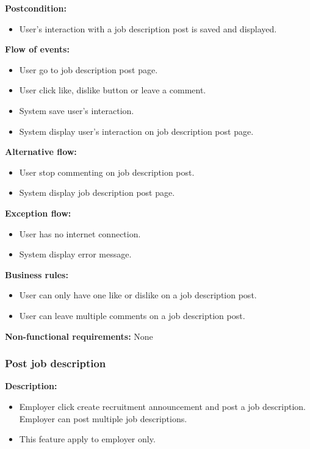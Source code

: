 \documentclass[a4paper]{article}
\begin{document}
\textbf{Postcondition:}
\begin{itemize}
  \item User's interaction with a job description post is saved and displayed.
\end{itemize}

\textbf{Flow of events:}
\begin{itemize}
  \item User go to job description post page.
  \item User click like, dislike button or leave a comment.
  \item System save user's interaction.
  \item System display user's interaction on job description post page.
\end{itemize}

\textbf{Alternative flow:}
\begin{itemize}
  \item User stop commenting on job description post.
  \item System display job description post page.
\end{itemize}

\textbf{Exception flow:}
\begin{itemize}
  \item User has no internet connection.
  \item System display error message.
\end{itemize}

\textbf{Business rules:}
\begin{itemize}
  \item User can only have one like or dislike on a job description post.
  \item User can leave multiple comments on a job description post.
\end{itemize}

\textbf{Non-functional requirements:}
None

\subsubsection{Post job description}
\textbf{Description:}
\begin{itemize}
  \item Employer click create recruitment announcement and post a job description. Employer can post multiple job descriptions.
  \item This feature apply to employer only.
\end{itemize}
\end{document}
